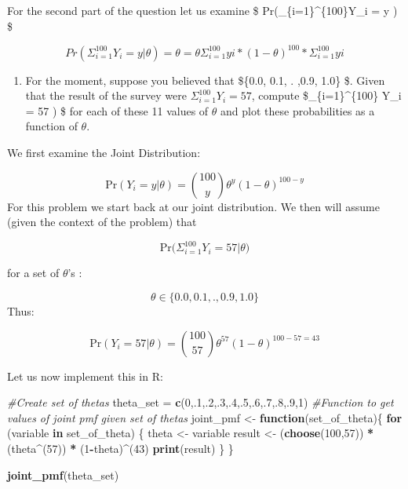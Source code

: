 \documentclass[]{article}
\newenvironment{Shaded}{\begin{snugshade}}{\end{snugshade}}
\newcommand{\KeywordTok}[1]{\textcolor[rgb]{0.13,0.29,0.53}{\textbf{#1}}}
\newcommand{\DecValTok}[1]{\textcolor[rgb]{0.00,0.00,0.81}{#1}}
\newcommand{\StringTok}[1]{\textcolor[rgb]{0.31,0.60,0.02}{#1}}
\newcommand{\CommentTok}[1]{\textcolor[rgb]{0.56,0.35,0.01}{\textit{#1}}}
\newcommand{\ControlFlowTok}[1]{\textcolor[rgb]{0.13,0.29,0.53}{\textbf{#1}}}
\newcommand{\OperatorTok}[1]{\textcolor[rgb]{0.81,0.36,0.00}{\textbf{#1}}}
\newcommand{\NormalTok}[1]{#1}
\providecommand{\tightlist}{%
  \setlength{\itemsep}{0pt}\setlength{\parskip}{0pt}}
\begin{document}
For the second part of the question let us examine \$
Pr(\Sigma\_\{i=1\}\^{}\{100\}Y\_i = y \textbar{} \theta) \$

\[Pr(\Sigma_{i=1}^{100}Y_i = y | \theta) = \theta = \theta \Sigma^{100}_{i=1} yi *(1-\theta)^{100} * \Sigma^{100}_{i=1} yi\]

\begin{enumerate}
\def\labelenumi{\alph{enumi})}
\setcounter{enumi}{1}
\tightlist
\item
  For the moment, suppose you believed that \$\theta \in \{0.0, 0.1, .
  ,0.9, 1.0\} \$. Given that the result of the survey were
  \(\Sigma_{i=1}^{100} Y_i = 57\), compute
  \$\Sigma\_\{i=1\}\^{}\{100\} Y\_i = 57 \textbar{} \theta) \$
  for each of these 11 values of \(\theta\) and plot these probabilities
  as a function of \(\theta\).
\end{enumerate}

We first examine the Joint Distribution:

\[ \text{Pr}(Y_i = y|\theta) = {100 \choose y} \theta^y (1-\theta)^{100-y} \]
For this problem we start back at our joint distribution. We then will
assume (given the context of the problem) that

\[ \text{Pr(}\Sigma_{i=1}^{100} Y_i = 57 | \theta) \]

for a set of \(\theta\)'s :

\[\theta \in \{0.0, 0.1, . ,0.9, 1.0\} \] Thus:

\[ \text{Pr}(Y_i = 57|\theta) = {100 \choose 57} \theta^{57} (1-\theta)^{100-57=43} \]

Let us now implement this in R:

\begin{Shaded}
\begin{Highlighting}[]
\CommentTok{#Create set of thetas}
\NormalTok{theta_set =}\StringTok{ }\KeywordTok{c}\NormalTok{(}\DecValTok{0}\NormalTok{,.}\DecValTok{1}\NormalTok{,.}\DecValTok{2}\NormalTok{,.}\DecValTok{3}\NormalTok{,.}\DecValTok{4}\NormalTok{,.}\DecValTok{5}\NormalTok{,.}\DecValTok{6}\NormalTok{,.}\DecValTok{7}\NormalTok{,.}\DecValTok{8}\NormalTok{,.}\DecValTok{9}\NormalTok{,}\DecValTok{1}\NormalTok{)}
\CommentTok{#Function to get values of joint pmf given set of thetas}
\NormalTok{joint_pmf <-}\StringTok{ }\ControlFlowTok{function}\NormalTok{(set_of_theta)\{}
  \ControlFlowTok{for}\NormalTok{ (variable }\ControlFlowTok{in}\NormalTok{ set_of_theta) \{}
\NormalTok{    theta <-}\StringTok{ }\NormalTok{variable}
\NormalTok{    result <-}\StringTok{ }\NormalTok{(}\KeywordTok{choose}\NormalTok{(}\DecValTok{100}\NormalTok{,}\DecValTok{57}\NormalTok{)) }\OperatorTok{*}\StringTok{ }\NormalTok{(theta}\OperatorTok{^}\NormalTok{(}\DecValTok{57}\NormalTok{)) }\OperatorTok{*}\StringTok{ }\NormalTok{(}\DecValTok{1}\OperatorTok{-}\NormalTok{theta)}\OperatorTok{^}\NormalTok{(}\DecValTok{43}\NormalTok{)}
    \KeywordTok{print}\NormalTok{(result)}
\NormalTok{  \}}
\NormalTok{\}}

\KeywordTok{joint_pmf}\NormalTok{(theta_set)}
\end{Highlighting}
\end{Shaded}
\end{document}
